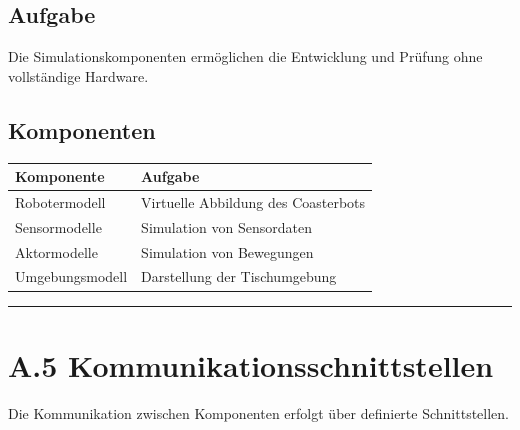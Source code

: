 \documentclass[
]{article}
\begin{document}
\subsection{Aufgabe}\label{aufgabe-11}

Die Simulationskomponenten ermöglichen die Entwicklung und Prüfung ohne
vollständige Hardware.

\subsection{Komponenten}\label{komponenten-2}

\begin{longtable}[]{@{}ll@{}}
\toprule\noalign{}
Komponente & Aufgabe \\
\midrule\noalign{}
\endhead
\bottomrule\noalign{}
\endlastfoot
Robotermodell & Virtuelle Abbildung des Coasterbots \\
Sensormodelle & Simulation von Sensordaten \\
Aktormodelle & Simulation von Bewegungen \\
Umgebungsmodell & Darstellung der Tischumgebung \\
\end{longtable}

\begin{center}\rule{0.5\linewidth}{0.5pt}\end{center}

\section{A.5
Kommunikationsschnittstellen}\label{a.5-kommunikationsschnittstellen}

Die Kommunikation zwischen Komponenten erfolgt über definierte
Schnittstellen.
\end{document}
